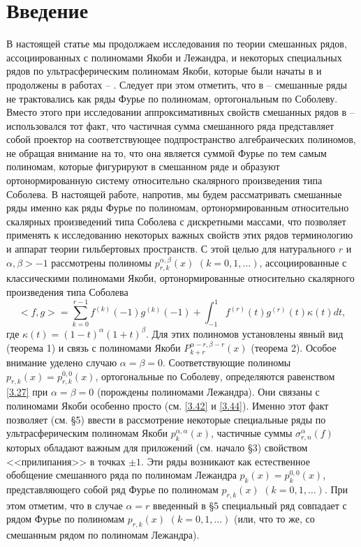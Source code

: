 \section{Введение}
В настоящей статье мы продолжаем исследования по теории смешанных рядов, ассоциированных с  полиномами Якоби и Лежандра, и  некоторых специальных рядов по ультрасферическим полиномам Якоби, которые были начаты в \cite{Shar11} и продолжены в работах
\cite{Shar12} -- \cite{sharap3}.  Следует при этом отметить, что  в \cite{Shar11} -- \cite{sharap3} смешанные ряды не трактовались как ряды Фурье по полиномам, ортогональным по Соболеву. Вместо этого при исследовании аппроксимативных свойств смешанных рядов в \cite{Shar11} -- \cite{sharap3} использовался тот факт, что  частичная сумма смешанного ряда представляет собой проектор на соответствующее подпространство алгебраических полиномов, не обращая внимание на то, что она является суммой Фурье по тем самым полиномам, которые фигурируют в смешанном ряде и образуют ортонормированную систему относительно скалярного произведения типа Соболева. В настоящей работе, напротив,  мы будем рассматривать смешанные ряды именно как ряды Фурье по полиномам, ортонормированным относительно скалярных произведений типа Соболева с дискретными массами, что позволяет применять к исследованию некоторых важных свойств этих рядов  терминологию и аппарат теории гильбертовых пространств. С этой целью для  натурального $r$ и $\alpha,\beta>-1$ рассмотрены полиномы $p^{\alpha,\beta}_{r,k}(x)$ $(k=0,1,\ldots)$, ассоциированные с  классическими полиномами Якоби, ортонормированные относительно скалярного произведения типа Соболева
\begin{equation}\label{1.1}
<f,g>=\sum_{k=0}^{r-1}f^{(k)}(-1)g^{(k)}(-1)+\int_{-1}^1 f^{(r)}(t)g^{(r)}(t)\kappa(t)dt,
\end{equation}
где $\kappa(t)=(1-t)^\alpha(1+t)^\beta$. Для этих полиномов установлены явный вид (теорема 1)  и связь с полиномами Якоби $P_{k+r}^{\alpha-r,\beta-r}(x)$ (теорема 2).  Особое внимание уделено случаю $\alpha=\beta=0$. Соответствующие полиномы $p_{r,k}(x)=p^{0,0}_{r,k}(x)$, ортогональные по Соболеву, определяются равенством \eqref{3.27} при $\alpha=\beta=0$ (порождены полиномами Лежандра). Они связаны с полиномами Якоби особенно просто (см.  \eqref{3.42} и \eqref{3.44}). Именно этот факт позволяет   (см. \S 5) ввести в рассмотрение некоторые специальные ряды по ультрасферическим полиномам Якоби $p_k^{\alpha,\alpha}(x)$, частичные суммы $\sigma_{r,n}^\alpha(f)$ которых обладают важным для приложений (см. начало \S 3) свойством <<прилипания>> в точках $\pm1$. Эти ряды возникают как естественное обобщение смешанного ряда по полиномам Лежандра $p_k(x)=p_k^{0,0}(x)$, представляющего собой ряд Фурье  по полиномам $p_{r,k}(x)$  $(k=0,1,\ldots)$. При этом отметим, что в случае $\alpha=r$ введенный в \S 5 специальный ряд совпадает с рядом Фурье по полиномам $p_{r,k}(x)$  $(k=0,1,\ldots)$ (или, что то же, со смешанным рядом по полиномам Лежандра).
